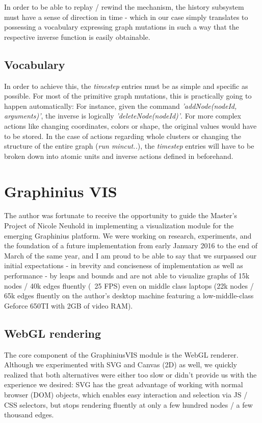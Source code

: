 	In order to be able to replay / rewind the mechanism, the history subsystem must have a sense of direction in time - which in our case simply translates to possessing a vocabulary expressing graph mutations in such a way that the respective inverse function is easily obtainable.
	
	\subsection{Vocabulary}
	\label{ssect:vocabulary}
	
	In order to achieve this, the \textit{timestep} entries must be as simple and specific as possible. For most of the primitive graph mutations, this is practically going to happen automatically: For instance, given the command \textit{'addNode(nodeId, arguments)'}, the inverse is logically \textit{'deleteNode(nodeId)'}. For more complex actions like changing coordinates, colors or shape, the original values would have to be stored. In the case of actions regarding whole clusters or changing the structure of the entire graph (\textit{run mincut..}), the \textit{timestep} entries will have to be broken down into atomic units and inverse actions defined in beforehand.


\section{Graphinius VIS}
\label{sect:graphinius_vis}

	The author was fortunate to receive the opportunity to guide the Master's Project of Nicole Neuhold in implementing a visualization module for the emerging Graphinius platform. We were working on research, experiments, and the foundation of a future implementation from early January 2016 to the end of March of the same year, and I am proud to be able to say that we surpassed our initial expectations - in brevity and conciseness of implementation as well as performance - by leaps and bounds and are not able to visualize graphs of 15k nodes / 40k edges fluently (~25 FPS) even on middle class laptops (22k nodes / 65k edges fluently on the author's desktop machine featuring a low-middle-class Geforce 650TI with 2GB of video RAM).
	
	\subsection{WebGL rendering}
	\label{ssect:webgl_rendering}
	
	The core component of the GraphiniusVIS module is the WebGL renderer. Although we experimented with SVG and Canvas (2D) as well, we quickly realized that both alternatives were either too slow or didn't provide us with the experience we desired: SVG has the great advantage of working with normal browser (DOM) objects, which enables easy interaction and selection via JS / CSS selectors, but stops rendering fluently at only a few hundred nodes / a few thousand edges.
	
